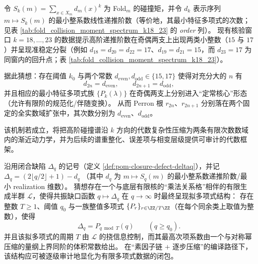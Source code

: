 \begin{conjecture}[高阶碰撞矩递推的奇偶稳定核与固定数域机制]\label{conj:pom-highk-collision-recurrence-parity-stable-core}
令 \(S_k(m)=\sum_{x\in X_m}d_m(x)^k\) 为 Fold\(_m\) 的碰撞矩，并令 \(d_k\) 表示序列 \(m\mapsto S_k(m)\) 的最小整系数线性递推阶数（等价地，其最小特征多项式的次数；见表 \ref{tab:fold_collision_moment_spectrum_k18_23} 的 \emph{order} 列）。
现有核验窗口 \(k=18,\dots,23\) 的数据提示高阶递推阶数在奇偶两支上出现两类小整数（\(15\) 与 \(17\)）并呈现准稳定分裂（例如 \(d_{18}=d_{20}=d_{22}=17\)、\(d_{19}=d_{21}=15\)，而 \(d_{23}=17\) 为同窗内的回升点；表 \ref{tab:fold_collision_moment_spectrum_k18_23}）。
\par
据此猜想：存在阈值 \(k_0\) 与两个常数 \(d_{\mathrm{even}},d_{\mathrm{odd}}\in\{15,17\}\) 使得对充分大的 \(n\) 有
\[
d_{2n}=d_{\mathrm{even}},\qquad d_{2n+1}=d_{\mathrm{odd}},
\]
并且相应的最小特征多项式族 \(\{P_k(\lambda)\}\) 在奇偶两支上分别进入“定常核心”形态（允许有限阶的规范化/伴随变换）。
从而 Perron 根 \(r_{2n}\)、\(r_{2n+1}\) 分别落在两个固定的全实数域扩张中，其次数分别为 \(d_{\mathrm{even}}\)、\(d_{\mathrm{odd}}\)。
\par
该机制若成立，将把高阶碰撞谱沿 \(k\) 方向的代数复杂性压缩为两条有限次数数域内的渐近动力学，并为后续的谱重整化、误差项与相变层级提供可审计的代数框架。
\end{conjecture}

\begin{conjecture}[共振缺口的拟多项式律与乘法半群的周期控制]\label{conj:pom-resonance-gap-quasipolynomial-semigroup}
沿用闭合缺陷 \(\Delta_q\) 的记号（定义 \ref{def:pom-closure-defect-deltaq}），并记
\(
\Delta_q=(2\lfloor q/2\rfloor+1)-d_q
\)
（其中 \(d_q\) 为 \(m\mapsto S_q(m)\) 的最小整系数递推阶数/最小 realization 维数）。
猜想存在一个与底层有限核的“乘法关系格”相伴的有限生成半群 \(\mathcal L\)，使得共振缺口函数 \(q\mapsto \Delta_q\) 在 \(q\to\infty\) 时最终呈现拟多项式结构：
存在整数 \(T\ge 1\)、阈值 \(q_0\) 与一族整值多项式 \(\{P_r\}_{r\in\ZZ/T\ZZ}\)（在每个同余类上取值为整数），使得
\[
\boxed{\;
\Delta_q=P_{q\bmod T}(q)\qquad(q\ge q_0).\;}
\]
并且该拟多项式的周期 \(T\) 由 \(\mathcal L\) 的挠信息控制，而其最高次项系数由一个与对称幂压缩的量纲上界同阶的体积常数给出。
在“素因子链 \(+\) 逐步压缩”的编译路径下，该结构应可被逐级审计地显化为有限多项式数据的闭包。
\end{conjecture}

